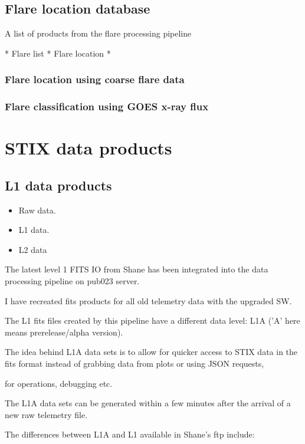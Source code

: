 \documentclass{aa}
\begin{document}
\subsection{Flare location database}


A list of products from the flare processing pipeline

* Flare list
* Flare location
*

\subsubsection{Flare location using coarse flare data}
\subsubsection{Flare classification using GOES x-ray flux}

\section{STIX data products}

\subsection{L1 data products}
\begin{itemize}
    \item Raw data.
    \item L1 data.
    \item L2 data
    
\end{itemize}

The latest level 1 FITS IO from Shane has been integrated into the data processing pipeline on pub023 server.

I have recreated fits products for all old telemetry data with the upgraded SW.

The L1 fits files  created by this pipeline have a different data level:  L1A ('A' here means  prerelease/alpha version).

The idea behind L1A data sets is to allow for quicker access to STIX data in the fits format instead of grabbing  data from plots or using JSON requests,

for operations,  debugging  etc.

The L1A data sets can be generated within a few minutes after the arrival of a new raw telemetry file.

The differences between L1A and L1 available in Shane's ftp include:
\end{document}
